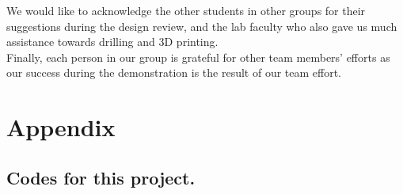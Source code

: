 \documentclass{article}
\begin{document}
We would like to acknowledge the other students in other groups for their suggestions during the design review, and the lab faculty who also gave us much assistance towards drilling and 3D printing.\\

Finally, each person in our group is grateful for other team members' efforts as our success during the demonstration is the result of our team effort.
\newpage

\section{Appendix}
\subsection*{Codes for this project.}

\end{document}
